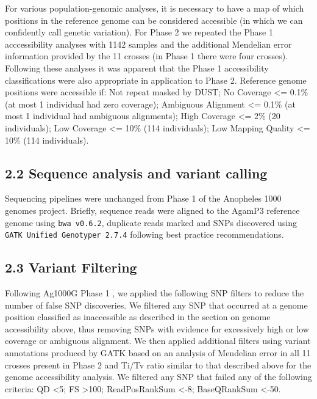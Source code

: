 \documentclass[a4paper,11pt,abstracton,hidelinks]{scrartcl}
\begin{document}
%
For various population-genomic analyses, it is necessary to have a map of which positions in the reference genome can be considered accessible (in which we can confidently call genetic variation).
%
For Phase 2 we repeated the Phase 1 acccessibility analyses \cite{Ag1000gConsortium2017} with 1142 samples and the additional Mendelian error information provided by the 11 crosses (in Phase 1 there were four crosses).
%
Following these analyses it was apparent that the Phase 1 accessibility classifications were also appropriate in application to Phase 2.
%
Reference genome positions were accessible if: 
Not repeat masked by DUST; 
No Coverage <= 0.1\% (at most 1 individual had zero coverage); 
Ambiguous Alignment <= 0.1\% (at most 1 individual had ambiguous alignments); 
High Coverage <= 2\% (20 individuals); 
Low Coverage <= 10\% (114 individuals); 
Low Mapping Quality <= 10\% (114 individuals).

\subsection*{2.2 Sequence analysis and variant calling}
%
Sequencing pipelines were unchanged from Phase 1 of the Anopheles 1000 genomes project\cite{Ag1000gConsortium2017}.
%
Briefly, sequence reads were aligned to the AgamP3 reference genome \cite{sharakhova2007update} using \texttt{bwa v0.6.2}, duplicate reads marked \cite{li2009} and SNPs discovered using \texttt{GATK Unified Genotyper 2.7.4} \cite{van2013} following best practice recommendations. 


\subsection*{2.3 Variant Filtering}
%
Following Ag1000G Phase 1 \cite{Ag1000gConsortium2017}, we applied the following SNP filters to reduce the number of false SNP discoveries.
%
We filtered any SNP that occurred at a genome position classified as inaccessible as described in the section on genome accessibility above, thus removing SNPs with evidence for excessively high or low coverage or ambiguous alignment. 
%
We then applied additional filters using variant annotations produced by GATK based on an analysis of Mendelian error in all 11 crosses present in Phase 2 and Ti/Tv ratio similar to that described above for the genome accessibility analysis.
%
We filtered any SNP that failed any of the following criteria: QD <5; FS >100; ReadPosRankSum <-8; BaseQRankSum <-50. 
\end{document}
